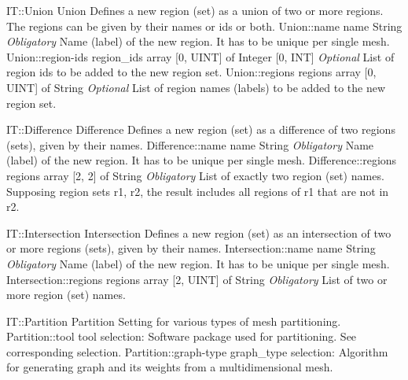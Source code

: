 \begin{RecordType}
	{IT::Union}
	{Union}
	{}%
	{}%
	{{{Defines a new region (set) as a union of two or more regions.
The regions can be given by their names or ids or both.}%
}}
		\RecKey
			{Union::name}
			{name}
			{{String}}{}
			{ \it{Obligatory}}
			{{{Name (label) of the new region.
It has to be unique per single mesh.}%
}}
		\RecKey
			{Union::region-ids}
			{region{\_}ids}
			{{array [0, UINT] of }{Integer [0, INT]}}{}
			{ \it{Optional}}
			{{{List of region ids to be added to the new region set.}%
}}
		\RecKey
			{Union::regions}
			{regions}
			{{array [0, UINT] of }{String}}{}
			{ \it{Optional}}
			{{{List of region names (labels) to be added to the new region set.}%
}}
\end{RecordType}
\begin{RecordType}
	{IT::Difference}
	{Difference}
	{}%
	{}%
	{{{Defines a new region (set) as a difference of two regions (sets), given by their names.}%
}}
		\RecKey
			{Difference::name}
			{name}
			{{String}}{}
			{ \it{Obligatory}}
			{{{Name (label) of the new region.
It has to be unique per single mesh.}%
}}
		\RecKey
			{Difference::regions}
			{regions}
			{{array [2, 2] of }{String}}{}
			{ \it{Obligatory}}
			{{{List of exactly two region (set) names.}\\{
Supposing region sets r1, r2, the result includes all regions of r1 that are not in r2.}%
}}
\end{RecordType}
\begin{RecordType}
	{IT::Intersection}
	{Intersection}
	{}%
	{}%
	{{{Defines a new region (set) as an intersection of two or more regions (sets), given by their names.}%
}}
		\RecKey
			{Intersection::name}
			{name}
			{{String}}{}
			{ \it{Obligatory}}
			{{{Name (label) of the new region.
It has to be unique per single mesh.}%
}}
		\RecKey
			{Intersection::regions}
			{regions}
			{{array [2, UINT] of }{String}}{}
			{ \it{Obligatory}}
			{{{List of two or more region (set) names.}%
}}
\end{RecordType}
\begin{RecordType}
	{IT::Partition}
	{Partition}
	{}%
	{}%
	{{{Setting for various types of mesh partitioning.}%
}}
		\RecKey
			{Partition::tool}
			{tool}
			{{selection: }}{}
			{ }
			{{{Software package used for partitioning.
See corresponding selection.}%
}}
		\RecKey
			{Partition::graph-type}
			{graph{\_}type}
			{{selection: }}{}
			{ }
			{{{Algorithm for generating graph and its weights from a multidimensional mesh.}%
}}
\end{RecordType}

